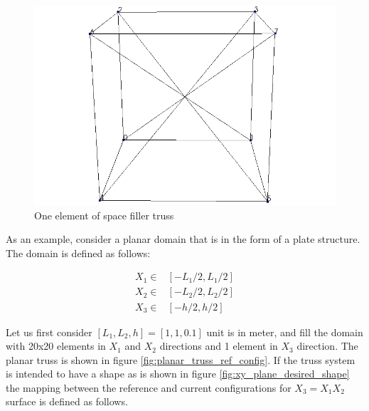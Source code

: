 \begin{figure} 
\centering
\includegraphics[width=6.0in]{./chap_5_active_trusses/images_space_filler/cube.png}
\caption{One element of space filler truss}
\label{fig:cuber_space_filler_truss}
\end{figure}

As an example, consider a planar domain that is in the form of a plate structure.
The domain is defined as follows: 

\begin{equation} 
\begin{aligned}
X_1 \in & [-L_1/2,L_1/2] \\
X_2 \in & [-L_2/2,L_2/2] \\
X_3 \in & [-h/2,h/2]
\end{aligned}
\label{planar_truss_domain:eqn}
\end{equation}
 
Let us first consider $[L_1,L_2,h]=[1,1,0.1]$ unit is in meter, and fill the domain with 20x20 elements in $X_1$ and $X_2$ directions and 1 element in $X_3$ direction. 
The planar truss is shown in figure \ref{fig:planar_truss_ref_config}.  
If the truss system is intended to have a shape as is shown in figure \ref{fig:xy_plane_desired_shape} the mapping between the reference and current configurations for $X_3=X_1 X_2$ surface is defined as follows.

